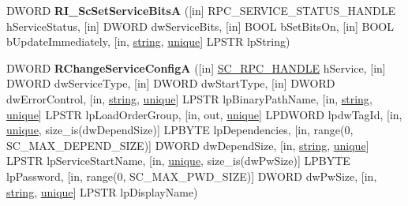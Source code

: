 \begin{DoxyCompactItemize}
\item 
\mbox{\label{interfacesvcctl_ad1a63788560dbc03d22b9ff16d6c2cdf}} 
D\+W\+O\+RD {\bfseries R\+I\+\_\+\+Sc\+Set\+Service\+BitsA} (\mbox{[}in\mbox{]} R\+P\+C\+\_\+\+S\+E\+R\+V\+I\+C\+E\+\_\+\+S\+T\+A\+T\+U\+S\+\_\+\+H\+A\+N\+D\+LE h\+Service\+Status, \mbox{[}in\mbox{]} D\+W\+O\+RD dw\+Service\+Bits, \mbox{[}in\mbox{]} B\+O\+OL b\+Set\+Bits\+On, \mbox{[}in\mbox{]} B\+O\+OL b\+Update\+Immediately, \mbox{[}in, \hyperlink{structstring}{string}, \hyperlink{interfaceunique}{unique}\mbox{]} L\+P\+S\+TR lp\+String)
\item 
\mbox{\label{interfacesvcctl_aba97192ed11777e67bec355324e2d789}} 
D\+W\+O\+RD {\bfseries R\+Change\+Service\+ConfigA} (\mbox{[}in\mbox{]} \hyperlink{interfacevoid}{S\+C\+\_\+\+R\+P\+C\+\_\+\+H\+A\+N\+D\+LE} h\+Service, \mbox{[}in\mbox{]} D\+W\+O\+RD dw\+Service\+Type, \mbox{[}in\mbox{]} D\+W\+O\+RD dw\+Start\+Type, \mbox{[}in\mbox{]} D\+W\+O\+RD dw\+Error\+Control, \mbox{[}in, \hyperlink{structstring}{string}, \hyperlink{interfaceunique}{unique}\mbox{]} L\+P\+S\+TR lp\+Binary\+Path\+Name, \mbox{[}in, \hyperlink{structstring}{string}, \hyperlink{interfaceunique}{unique}\mbox{]} L\+P\+S\+TR lp\+Load\+Order\+Group, \mbox{[}in, out, \hyperlink{interfaceunique}{unique}\mbox{]} L\+P\+D\+W\+O\+RD lpdw\+Tag\+Id, \mbox{[}in, \hyperlink{interfaceunique}{unique}, size\+\_\+is(dw\+Depend\+Size)\mbox{]} L\+P\+B\+Y\+TE lp\+Dependencies, \mbox{[}in, range(0, S\+C\+\_\+\+M\+A\+X\+\_\+\+D\+E\+P\+E\+N\+D\+\_\+\+S\+I\+ZE)\mbox{]} D\+W\+O\+RD dw\+Depend\+Size, \mbox{[}in, \hyperlink{structstring}{string}, \hyperlink{interfaceunique}{unique}\mbox{]} L\+P\+S\+TR lp\+Service\+Start\+Name, \mbox{[}in, \hyperlink{interfaceunique}{unique}, size\+\_\+is(dw\+Pw\+Size)\mbox{]} L\+P\+B\+Y\+TE lp\+Password, \mbox{[}in, range(0, S\+C\+\_\+\+M\+A\+X\+\_\+\+P\+W\+D\+\_\+\+S\+I\+ZE)\mbox{]} D\+W\+O\+RD dw\+Pw\+Size, \mbox{[}in, \hyperlink{structstring}{string}, \hyperlink{interfaceunique}{unique}\mbox{]} L\+P\+S\+TR lp\+Display\+Name)
\item 
\mbox{\label{interfacesvcctl_a346932827fc41b61b1e33227ac7e1719}} 

\end{DoxyCompactItemize}
